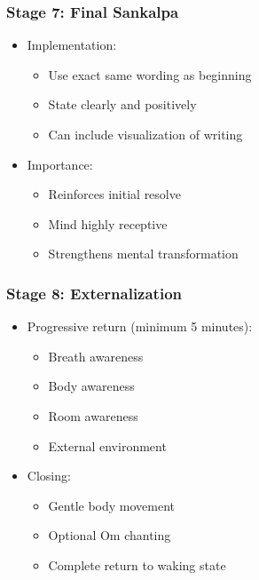 \begin{frame}[fragile]\frametitle{Stage 7: Final Sankalpa}
    \begin{itemize}
        \item Implementation:
            \begin{itemize}
                \item Use exact same wording as beginning
                \item State clearly and positively
                \item Can include visualization of writing
            \end{itemize}
        \item Importance:
            \begin{itemize}
                \item Reinforces initial resolve
                \item Mind highly receptive
                \item Strengthens mental transformation
            \end{itemize}
    \end{itemize}
\end{frame}

\begin{frame}[fragile]\frametitle{Stage 8: Externalization}
    \begin{itemize}
        \item Progressive return (minimum 5 minutes):
            \begin{itemize}
                \item Breath awareness
                \item Body awareness
                \item Room awareness
                \item External environment
            \end{itemize}
        \item Closing:
            \begin{itemize}
                \item Gentle body movement
                \item Optional Om chanting
                \item Complete return to waking state
            \end{itemize}
    \end{itemize}
\end{frame}

